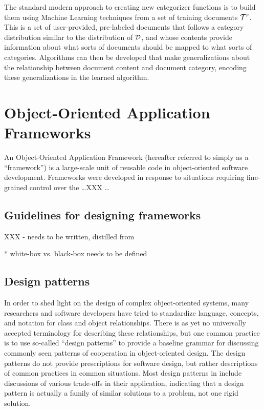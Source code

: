The standard modern approach to creating new categorizer functions is
to build them using Machine Learning techniques from a set of training
documents $\mathcal{T}^r$.\cite[p. 2]{sebastiani:02} This is a set of
user-provided, pre-labeled documents that follows a category
distribution similar to the distribution of $\mathcal{D}$, and whose contents
provide information about what sorts of documents should be mapped to
what sorts of categories.  Algorithms can then be developed that make
generalizations about the relationship between document content and
document category, encoding these generalizations in the learned algorithm.

\section{Object-Oriented Application Frameworks}

An Object-Oriented Application Framework (hereafter referred to simply
as a ``framework'') is a large-scale unit of reusable code in
object-oriented
software development.  Frameworks were developed in response to
situations requiring fine-grained control over the \ldots XXX \ldots

\subsection{Guidelines for designing frameworks}

XXX - needs to be written, distilled from \cite{fayad:99}

 * white-box vs. black-box needs to be defined

\subsection{Design patterns}
\label{patterns}

In order to shed light on the design of complex object-oriented
systems, many researchers and software developers have tried to
standardize language, concepts, and notation for class and object
relationships.  There is as yet no universally accepted terminology
for describing these relationships, but one common practice is to use
so-called ``design patterns'' to provide a baseline grammar for
discussing commonly seen patterns of cooperation in object-oriented
design. \cite[p. 3]{gamma:95} The design patterns do not provide
prescriptions for software design, but rather descriptions of common
practices in common situations.  Most design patterns in
\cite{gamma:95} include discussions of various trade-offs in their
application, indicating that a design pattern is actually a family of
similar solutions to a problem, not one rigid solution.

